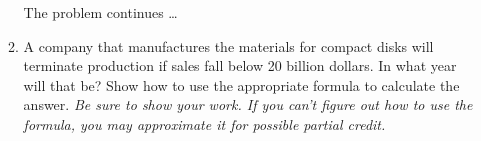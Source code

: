 \documentclass[11pt]{article}
\begin{document}
\begin{enumerate}
\begin{enumerate}
\newpage

\hspace{-.5in}  The problem continues \dots

\item A company that manufactures the materials for compact disks will terminate production if sales fall below 20 billion dollars.  In what year will that be?  Show how to use the appropriate formula to calculate the answer.  \emph{Be sure to show your work.  If you can't figure out how to use the formula, you may approximate it for possible partial credit.}
\vfill
\vfill
\end{enumerate}







\end{enumerate}
\end{document}
